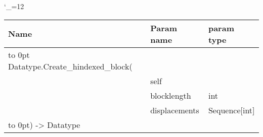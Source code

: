 \begingroup \catcode`\_=12 \tt
\begin{tabular}{lll}
\toprule
\textrm{Name}&\textrm{Param name}&\textrm{param type}\\
\midrule
\hbox to 0pt {Datatype.Create_hindexed_block(\hss}\\
& self\\
& blocklength & int\\
& displacements & Sequence[int]\\
\hbox to 0pt{) -> Datatype\hss}\\
\bottomrule
\end{tabular}
\endgroup
